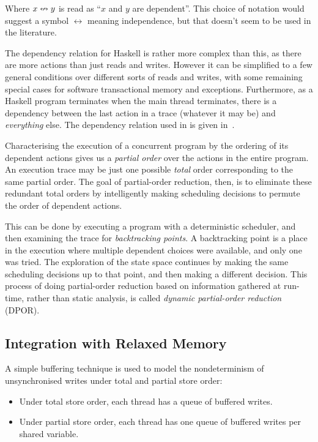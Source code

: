 Where $x \nleftrightarrow y$ is read as ``$x$ and $y$ are dependent''.  This choice of
notation would suggest a symbol $\leftrightarrow$ meaning independence, but that
doesn't seem to be used in the literature.

The dependency relation for Haskell is rather more complex than this, as there
are more actions than just reads and writes.  However it can be simplified to a
few general conditions over different sorts of reads and writes, with some
remaining special cases for software transactional memory and exceptions.
Furthermore, as a Haskell program terminates when the main thread terminates,
there is a dependency between the last action in a trace (whatever it may be)
and \emph{everything} else.  The dependency relation used in \dejafu{} is given
in~.

Characterising the execution of a concurrent program by the ordering of its
dependent actions gives us a \emph{partial order} over the actions in the entire
program.  An execution trace may be just one possible \emph{total} order
corresponding to the same partial order.  The goal of partial-order reduction,
then, is to eliminate these redundant total orders by intelligently making
scheduling decisions to permute the order of dependent actions.

This can be done by executing a program with a deterministic scheduler, and then
examining the trace for \emph{backtracking points}.  A backtracking point is a
place in the execution where multiple dependent choices were available, and only
one was tried.  The exploration of the state space continues by making the same
scheduling decisions up to that point, and then making a different decision.
This process of doing partial-order reduction based on information gathered at
run-time, rather than static analysis, is called \emph{dynamic partial-order
  reduction} (DPOR).

\subsection{Integration with Relaxed Memory}

A simple buffering technique is used to model the nondeterminism of
unsynchronised writes under total and partial store order\cite{zhang2015}:

\begin{itemize}
\item Under total store order, each thread has a queue of buffered writes.
\item Under partial store order, each thread has one queue of buffered writes
  per shared variable.
\end{itemize}

